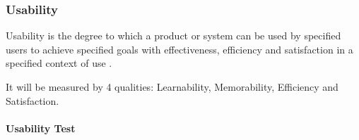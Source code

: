 \documentclass[12pt, titlepage]{article}
\begin{document}

\subsubsection{Usability} \label{sec_usabilitytest}

Usability is the degree to which a product or system
can be used by specified users to achieve specified goals with effectiveness,
efficiency and satisfaction in a specified context of use
\cite{ISO/IEC25010:2011}.
    
    It will be measured by 4 qualities: Learnability, Memorability, Efficiency
and Satisfaction.
		
\paragraph{Usability Test}
\end{document}
